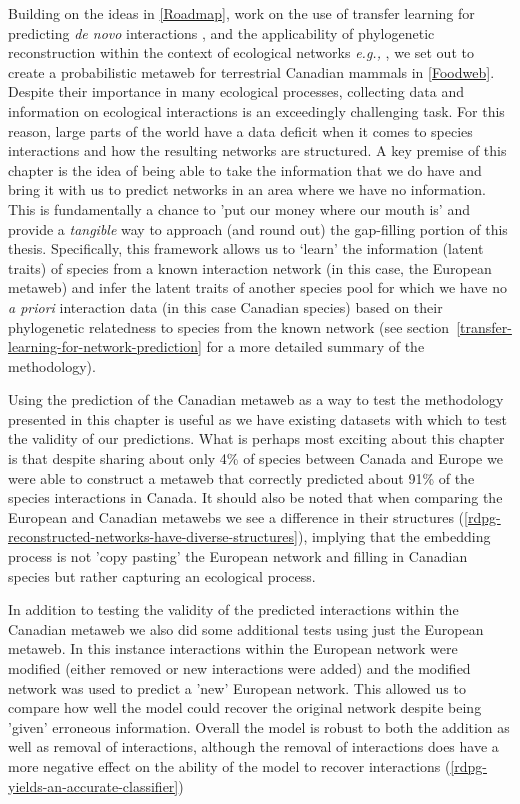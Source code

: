 Building on the ideas in \autoref{Roadmap}, work on the use of 
transfer learning for predicting \emph{de novo} interactions
\cite{Runghen2021ExpNod}, and the applicability of phylogenetic
reconstruction within the context of ecological networks \emph{e.g.,}
\cite{Braga2021PhyRec}, we set out to create a probabilistic metaweb for
terrestrial Canadian mammals in \autoref{Foodweb}. Despite their importance in many ecological processes, collecting data and information on ecological interactions is an exceedingly challenging task. For this reason, large parts of the world have a data deficit when it comes to species interactions and how the resulting networks are structured. A key premise of this chapter is the idea of being able to take the information that we do have and bring it with us to predict networks in an area where we have no information. This is fundamentally a chance to 'put our money where our mouth is' and provide a \emph{tangible} way to approach (and round out) the gap-filling portion of this thesis. Specifically, this framework allows us to ‘learn’ the information (latent traits) of species from a known interaction network (in this case, the European metaweb) and infer the latent traits of another species pool for which we have no \emph{a priori} interaction data (in this case Canadian species) based on their phylogenetic relatedness to species from the known network (see section~\ref{transfer-learning-for-network-prediction} for a more detailed summary of the methodology). 

Using the prediction of the Canadian metaweb as a way to test the methodology presented in this chapter is useful as we have existing datasets with which to test the validity of our predictions. What is perhaps most exciting about this chapter is that despite sharing about only 4\% of species between Canada and Europe we were able to construct a metaweb that correctly predicted about 91\% of the species interactions in Canada. It should also be noted that when comparing  the European and Canadian metawebs we see a difference in their structures (\autoref{rdpg-reconstructed-networks-have-diverse-structures}), implying that the embedding process is not 'copy pasting' the European network and filling in Canadian species but rather capturing an ecological process.

In addition to testing the validity of the predicted interactions within the Canadian metaweb we also did some additional tests using just the European metaweb. In this instance interactions within the European network were modified (either removed or new interactions were added) and the modified network was used to predict a 'new' European network. This allowed us to compare how well the model could recover the original network despite being 'given' erroneous information. Overall the model is robust to both the addition as well as removal of interactions, although the removal of interactions does have a more negative effect on the ability of the model to recover interactions (\autoref{rdpg-yields-an-accurate-classifier})

